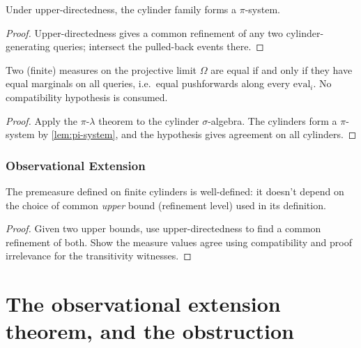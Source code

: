 \begin{lemma}
\label{lem:pi-system}
\leanok
{}
Under upper-directedness, the cylinder family forms a $\pi$-system.
\end{lemma}

\begin{proof}
\leanok
Upper-directedness gives a common refinement of any two cylinder-generating queries; intersect the pulled-back events there.
\end{proof}

\begin{theorem}
\label{thm:observational-determination}
\leanok
{}
Two (finite) measures on the projective limit $\Omega$ are equal if and only if
they have equal marginals on all queries, i.e.\ equal pushforwards along every
$\mathrm{eval}_i$. No compatibility hypothesis is consumed.
\end{theorem}

\begin{proof}
\leanok
Apply the $\pi$-$\lambda$ theorem to the cylinder $\sigma$-algebra. The cylinders form a $\pi$-system by \ref{lem:pi-system}, and the hypothesis gives agreement on all cylinders.
\end{proof}

\subsection{Observational Extension}

\begin{lemma}
\label{lem:premu-well-defined}
\leanok
{}
The premeasure defined on finite cylinders is well-defined: it doesn't depend on the choice of common \emph{upper} bound (refinement level) used in its definition.
\end{lemma}

\begin{proof}
\leanok
Given two upper bounds, use upper-directedness to find a common refinement of both. Show the measure values agree using compatibility and proof irrelevance for the transitivity witnesses.
\end{proof}
\chapter{The observational extension theorem, and the obstruction}

